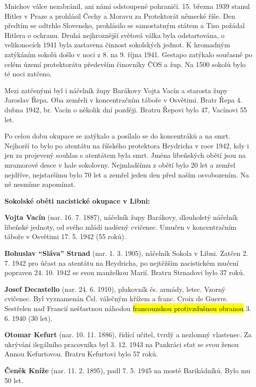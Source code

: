 Mnichov válce nezabránil, ani námi odstoupené pohraničí. 15. března 1939
stanul Hitler v Praze a prohlásil Čechy a Moravu za Protektorát německé
říše. Den předtím se odtrhlo Slovensko, prohlásilo se samostatným státem
a Tiso požádal Hitlera o ochranu. Druhá nejhroznější světová válka byla
odstartována, o velikonocích 1941 byla zastavena činnost sokolských
jednot. K hromadným zatýkáním sokolů došlo v noci z 8. na 9. října 1941.
Gestapo zatýkalo současně po celém území protektorátu především
činovníky ČOS a žup. Na 1500 sokolů bylo té noci zatčeno.

Mezi zatčenými byl i náčelník župy Barákovy Vojta Vacín a starosta župy
Jaroslav Řepa. Oba zemřeli v koncentračním táboře v Osvětimi. Bratr Řepa
4. dubna 1942, br. Vacín o několik dní později. Bratru Řepovi bylo 47,
Vacínovi 55 let.

Po celou dobu okupace se zatýkalo a posílalo se do koncentráků a na
smrt. Nejhorší to bylo po atentátu na říšského protektora Heydricha v
roce 1942, kdy i jen za projevený souhlas s atentátem byla smrt. Jména
libeňských obětí jsou na mramorové desce v hale sokolovny. Nejmladšímu z
obětí bylo 20 let a zemřel nejdříve, nejstaršímu bylo 70 let a zemřel
jeden den před naším osvobozením. Na ně nesmíme zapomínat.

\textbf{Sokolské oběti nacistické okupace v Libni:}

\textbf{Vojta Vacín} (nar. 16. 7. 1887), náčelník župy Barákovy,
dlouholetý náčelník libeňské jednoty, od svého mládí nadšený cvičenec.
Umučen v koncentračním táboře v Osvětimi 17. 5. 1942 (55 roků).

\textbf{Bohuslav ``Sláva'' Strnad} (nar. 1. 3. 1905), náčelník Sokola v
Libni. Zatčen 2. 7. 1942 pro účast na atentátu na Heydricha, po
nejtěžším nacistickém mučení popraven 24. 10. 1942 se svou manželkou
Marií. Bratru Strnadovi bylo 37 roků.

\textbf{Josef Decastello} (nar. 24. 6. 1910), plukovník čs. armády,
letec. Vzorný cvičenec. Byl vyznamenán Čsl. válečným křížem a franc.
Croix de Guerre. Sestřelen nad Francií nešťastnou náhodou
\hl{francouzskou protivzdušnou obranou} 3. 6. 1940 (30 let).

\textbf{Otomar Kefurt} (nar. 10. 11. 1886), řídící učitel, tvrdý a
nezlomný vlastenec. Za ukrývání ilegálního pracovníka byl 3. 12. 1943 na
Pankráci sťat se svou ženou Annou Kefurtovou. Bratru Kefurtovi bylo 57
roků.

\textbf{Čeněk Kníže} (nar. 11. 2. 1895), padl 7. 5. 1945 na mostě
Barikádníků. Bylo mu 50 let.

